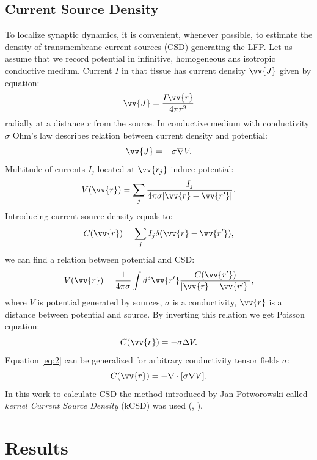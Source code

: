 \documentclass{pracalicmgr}
\begin{document}
    \section{Current Source Density}
    To localize synaptic dynamics, it is convenient, whenever possible, to estimate the density of transmembrane current sources (CSD) generating the LFP.
    Let us assume that we record potential in infinitive, homogeneous ans isotropic conductive medium. Current $I$ in that tissue has current density $\vv{J}$ given by equation:
    \begin{equation}
    \vv{J}= \frac{I \vv{r}}{4\pi r^2}
    \end{equation}
    radially at a distance $r$ from the source. In conductive medium with conductivity $\sigma$ Ohm's law describes relation between current density and potential:
    \begin{equation}
    \vv{J}=-\sigma \nabla V.
    \end{equation}
    Multitude of currents $I_j$ located at $\vv{r_j}$ induce potential:
    \begin{equation}
    V(\vv{r})=\sum_{j} \frac{I_j}{4 \pi \sigma |\vv{r}-\vv{r'}|} .
    \end{equation}
    Introducing current source density equals to:
    \begin{equation}
    C(\vv{r})=\sum_{j} I_j \delta (\vv{r}-\vv{r'}),
    \end{equation}
    we can find a relation between potential and CSD:
    \begin{equation}
    V(\vv{r})=\frac{1}{4\pi\sigma}\int d^3 \vv{r'} \frac{C(\vv{r'})}{|\vv{r}-\vv{r'}|},
    \end{equation}
    where $V$ is potential generated by sources, $\sigma$ is a conductivity, $\vv{r}$ is a distance between potential and source. By inverting this relation we get Poisson equation:
    \begin{equation}
    C(\vv{r})=-\sigma \Delta V.
    \label{eq:2}
    \end{equation}
    Equation \ref{eq:2} can be generalized for arbitrary conductivity tensor fields $\sigma$:
    \begin{equation}
    C(\vv{r})=-\nabla \cdot [\sigma \nabla V].
    \end{equation}
    In this work to calculate CSD the method introduced by Jan Potworowski called \textit{kernel Current Source Density} (kCSD) was used (\cite{wojcik}, \cite{potworowski}).
    
    \chapter{Results}
\end{document}
